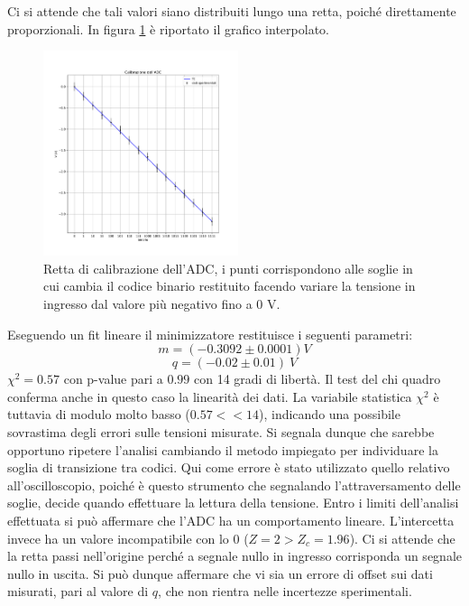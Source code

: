 \documentclass[journal]{IEEEtran}
\begin{document}
Ci si attende che tali valori siano distribuiti lungo una retta, poiché direttamente proporzionali. In figura \ref{fig:graph_calibrazione_adc} è riportato il grafico interpolato.

\begin{figure}[H]%
\centering
\begin{center}
\includegraphics[width=0.51\textwidth]{analysis/output/calibrazione_adc.pdf}
\end{center}
\caption{Retta di calibrazione dell'ADC, i punti corrispondono alle soglie in cui cambia il codice binario restituito facendo variare la tensione in ingresso dal valore più negativo fino a 0 V.}
\label{fig:graph_calibrazione_adc}
\end{figure}

Eseguendo un fit lineare il minimizzatore restituisce i seguenti parametri:
\[ m = (-0.3092 \pm 0.0001) V \] 
\[ q = (-0.02 \pm 0.01) \ V \] 
$ \chi^{2} = 0.57 $ con p-value pari a $0.99$ con 14 gradi di libertà.
\newline
Il test del chi quadro conferma anche in questo caso la linearità dei dati. La variabile statistica $\chi^2$ è tuttavia di modulo molto basso ($0.57 << 14$), indicando una possibile sovrastima degli errori sulle tensioni misurate. Si segnala dunque che sarebbe opportuno ripetere l'analisi cambiando il metodo impiegato per individuare la soglia di transizione tra codici. Qui come errore è stato utilizzato quello relativo all'oscilloscopio, poiché è questo strumento che segnalando l'attraversamento delle soglie, decide quando effettuare la lettura della tensione. Entro i limiti dell'analisi effettuata si può affermare che l'ADC ha un comportamento lineare.
L'intercetta invece ha un valore incompatibile con lo 0 ($Z = 2 > Z_c = 1.96$). Ci si attende che la retta passi nell'origine perché a segnale nullo in ingresso corrisponda un segnale nullo in uscita. Si può dunque affermare che vi sia un errore di offset sui dati misurati, pari al valore di $q$, che non rientra nelle incertezze sperimentali.
\end{document}
